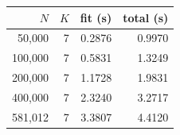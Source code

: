 \begin{tabular}{rrrr}
\toprule
$N$ & $K$ & fit (s) & total (s)\\
\midrule
50,000 & 7 & 0.2876 & 0.9970\\
100,000 & 7 & 0.5831 & 1.3249\\
200,000 & 7 & 1.1728 & 1.9831\\
400,000 & 7 & 2.3240 & 3.2717\\
581,012 & 7 & 3.3807 & 4.4120\\
\bottomrule
\end{tabular}
